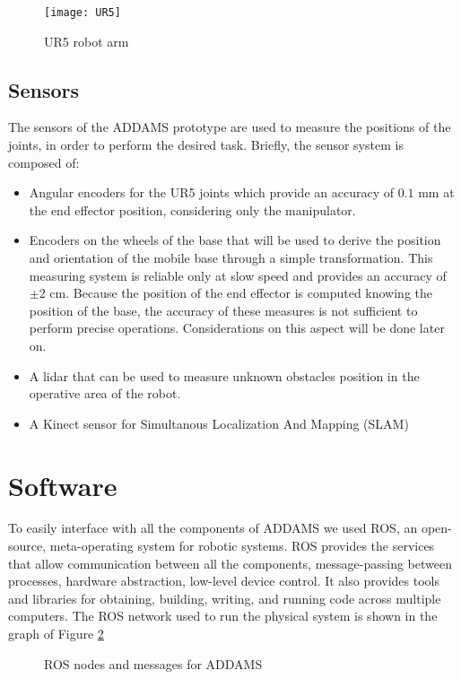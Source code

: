 \begin{figure}[htbp]
\begin{center} 
	\texttt{[image: UR5]}
	\centering
	\label{fig:UR5}
	\caption{UR5 robot arm} 
\end{center}
\end{figure}


\subsection{Sensors}

The sensors of the ADDAMS prototype are used to measure the positions of the joints, in order to perform the desired task. Briefly, the sensor system is composed of:
\begin{itemize}
\item Angular encoders for the UR5 joints which provide an accuracy of $0.1$ mm at the end effector position, considering only the manipulator.
\item Encoders on the wheels of the base that will be used to derive the position and orientation of the mobile base through a simple transformation. This measuring system is reliable only at slow speed and provides an accuracy of $\pm 2$ cm. Because the position of the end effector is computed knowing the position of the base, the accuracy of these measures is not sufficient to perform precise operations. Considerations on this aspect will be done later on.
\item A lidar that can be used to measure unknown obstacles position in the operative area of the robot.
\item A Kinect sensor for Simultanous Localization And Mapping (SLAM)
\end{itemize}

\section{Software}

To easily interface with all the components of ADDAMS we used ROS, an open-source, meta-operating system for robotic systems. ROS provides the services that allow communication between all the components, message-passing between processes, hardware abstraction, low-level device control. It also provides tools and libraries for obtaining, building, writing, and running code across multiple computers. The ROS network used to run the physical system is shown in the graph of Figure \ref{ROSnodes}
\begin{figure}[h!]

\centering

\caption{ROS nodes and messages for ADDAMS}
\label{ROSnodes} 
\end{figure}

